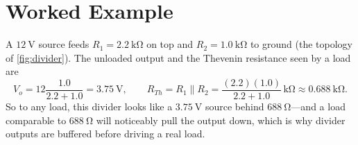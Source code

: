 \section{Worked Example}
A \(\SI{12}{\volt}\) source feeds \(R_1=\SI{2.2}{\kilo\ohm}\) on top and
\(R_2=\SI{1.0}{\kilo\ohm}\) to ground (the topology of \cref{fig:divider}). The
unloaded output and the Thevenin resistance seen by a load are
\[
V_o=12\frac{1.0}{2.2+1.0}=\SI{3.75}{\volt},
\qquad
R_{Th}=R_1\parallel R_2=\frac{(2.2)(1.0)}{2.2+1.0}\,\si{\kilo\ohm}
\approx\SI{0.688}{\kilo\ohm}.
\]
So to any load, this divider looks like a \(\SI{3.75}{\volt}\) source behind
\(\SI{688}{\ohm}\)---and a load comparable to \(\SI{688}{\ohm}\) will noticeably
pull the output down, which is why divider outputs are buffered before driving a
real load.
